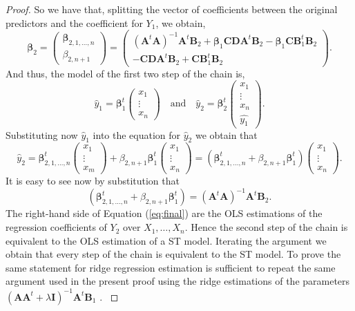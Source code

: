\documentclass[11pt,a4paper, twoside]{book}
\begin{document}
\begin{proof}
{So we have that, splitting the vector of coefficients between the original predictors and the coefficient for $Y_1$, we obtain,
$$ \bm{\beta}_{2}=\left( 
\begin{array}{c}
{\bm{\beta}}_{2,1,\ldots,n} \\ \hline 
\beta_{2,n+1}
\end{array}
\right)
=\left(  
\begin{array}{c}
(\bm{A}^{t}\bm{A})^{-1}\bm{A}^t\bm{B}_2 +\bm{\beta}_{1}\bm{CD}\bm{A}^t\bm{B}_2 - \bm{\beta}_1 \bm{C}\bm{B}_1^{t}\bm{B}_2 \\ \hline
-\bm{CD}\bm{A}^t\bm{B}_2 + \bm{C} \bm{B}_1^t\bm{B}_2
\end{array}
\right).$$
And thus, the model of the first two step of the chain is,
$$
\hat{y}_1= \bm{\beta}_1^{t}\left(\begin{array}{c}
x_1 \\
\vdots \\
x_n
\end{array}\right) \quad \text{and} \quad
\hat{y}_2= \bm{\beta}_2^{t}\left(\begin{array}{c}
x_1 \\
\vdots \\
x_n \\
\hat{y_1} 
\end{array}\right). 
$$
Substituting now $\hat{y}_1$ into the equation for $\hat{y}_2$ we obtain that
$$\hat{y}_2={\bm{\beta}}_{2,1,\ldots,n}^{t}\left(\begin{array}{c}
x_1 \\
\vdots \\
x_m
\end{array}\right) + \beta_{2,n+1}\bm{\beta}_1^{t}\left(\begin{array}{c}
x_1 \\
\vdots \\
x_n
\end{array}\right)=\left( 
{\bm{\beta}}_{2,1,\ldots,n}^{t}+\beta_{2,n+1}\bm{\beta}_1^t
\right)\left(\begin{array}{c}
x_1 \\
\vdots \\
x_n
\end{array}\right) . 
$$
It is easy to see now by substitution that 
\begin{equation}
\label{eq:final}
\left( 
{\bm{\beta}}_{2,1,\ldots,n}^{t}+\beta_{2,n+1}\bm{\beta}_1^t
\right)=(\bm{A}^{t}\bm{A})^{-1}\bm{A}^{t}\bm{B}_2.
\end{equation}
The right-hand side of Equation (\ref{eq:final}) are the OLS estimations of the regression coefficients of $Y_2$ over $X_1,\ldots,X_n$. Hence the second step of the chain is equivalent to the OLS estimation of a ST model. Iterating the argument we obtain that every step of the chain is equivalent to the ST model.
To prove the same statement for ridge regression estimation is sufficient to repeat the same argument used in the present proof using the ridge estimations of the parameters $(\bm{A}\bm{A}^{t} + \lambda\bm{I})^{-1}\bm{A}^{t}\bm{B}_1$ \citep{hoerl1970}. 
}
\end{proof}
\end{document}
